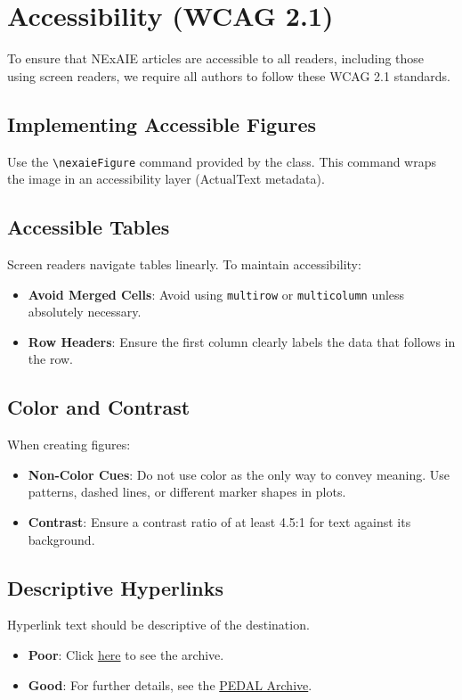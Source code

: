\section{Accessibility (WCAG 2.1)}
To ensure that NExAIE articles are accessible to all readers, including those using screen readers, we require all authors to follow these WCAG 2.1 standards.

\subsection{Implementing Accessible Figures}
Use the \texttt{\textbackslash nexaieFigure} command provided by the class. This command wraps the image in an accessibility layer (ActualText metadata).


\subsection{Accessible Tables}
Screen readers navigate tables linearly. To maintain accessibility:
\begin{itemize}
    \item \textbf{Avoid Merged Cells}: Avoid using \texttt{multirow} or \texttt{multicolumn} unless absolutely necessary.
    \item \textbf{Row Headers}: Ensure the first column clearly labels the data that follows in the row.
\end{itemize}

\subsection{Color and Contrast}
When creating figures:
\begin{itemize}
    \item \textbf{Non-Color Cues}: Do not use color as the only way to convey meaning. Use patterns, dashed lines, or different marker shapes in plots.
    \item \textbf{Contrast}: Ensure a contrast ratio of at least 4.5:1 for text against its background.
\end{itemize}

\subsection{Descriptive Hyperlinks}
Hyperlink text should be descriptive of the destination. 
\begin{itemize}
    \item \textbf{Poor}: Click \href{https://kahveci.pw/pedal}{here} to see the archive.
    \item \textbf{Good}: For further details, see the \href{https://kahveci.pw/pedal}{PEDAL Archive}.
\end{itemize}
